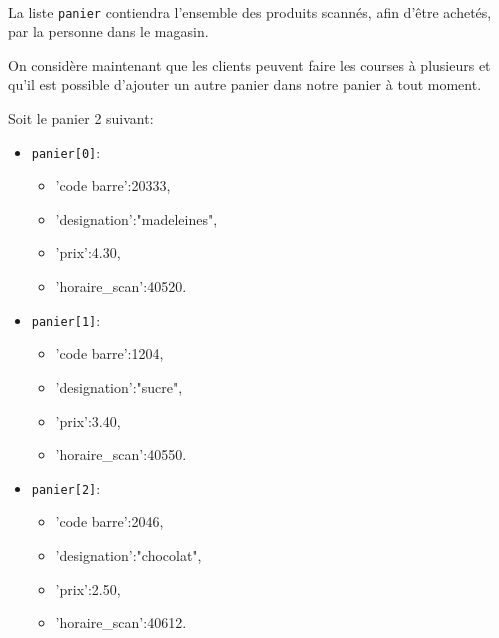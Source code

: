 
~\

La liste \texttt{panier} contiendra l'ensemble des produits scannés, afin d'être achetés, par la personne dans le magasin.


On considère maintenant que les clients peuvent faire les courses à plusieurs et qu'il est possible d'ajouter un autre panier dans notre panier à tout moment.

Soit le panier 2 suivant:
\begin{itemize}
 \item \texttt{panier[0]}:
 \begin{itemize}
  \item 'code barre':20333,
  \item 'designation':"madeleines",
  \item 'prix':4.30,
  \item 'horaire\_scan':40520.
 \end{itemize}
 \item \texttt{panier[1]}:
 \begin{itemize}
  \item 'code barre':1204,
  \item 'designation':"sucre",
  \item 'prix':3.40,
  \item 'horaire\_scan':40550.
 \end{itemize}
 \item \texttt{panier[2]}:
 \begin{itemize}
  \item 'code barre':2046,
  \item 'designation':"chocolat",
  \item 'prix':2.50,
  \item 'horaire\_scan':40612.
 \end{itemize}
\end{itemize}

  
